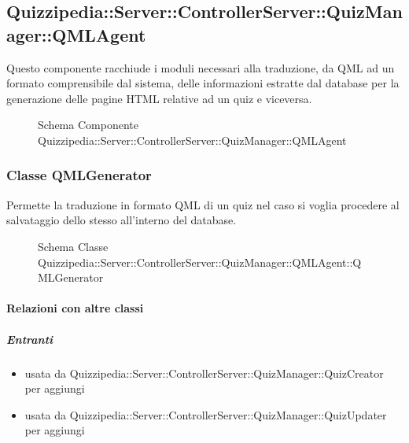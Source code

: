 \subsection{Quizzipedia::Server::ControllerServer::QuizManager::QMLAgent}
Questo componente racchiude i moduli necessari alla traduzione, da QML ad un formato comprensibile dal sistema, delle informazioni estratte dal database per la generazione delle pagine HTML relative ad un quiz e viceversa.
\begin{figure}[H]
\centering
\noindent{}
\caption[Schema Componente Quizzipedia::Server::ControllerServer::QuizManager::QMLAgent]{Schema Componente Quizzipedia::Server::ControllerServer::QuizManager::QMLAgent}
\end{figure}
\subsubsection{Classe QMLGenerator}
Permette la traduzione in formato QML di un quiz nel caso si voglia procedere al salvataggio dello stesso all'interno del database.
\begin{figure}[H]
\centering
\noindent{}
\caption[Schema Classe QMLGenerator]{Schema Classe Quizzipedia::Server::ControllerServer::QuizManager::QMLAgent::QMLGenerator}
\end{figure}
\paragraph{Relazioni con altre classi}
\subparagraph{Entranti}
\begin{itemize}
\item usata da Quizzipedia::Server::ControllerServer::QuizManager::QuizCreator per aggiungi
\item usata da Quizzipedia::Server::ControllerServer::QuizManager::QuizUpdater per aggiungi
\end{itemize}
